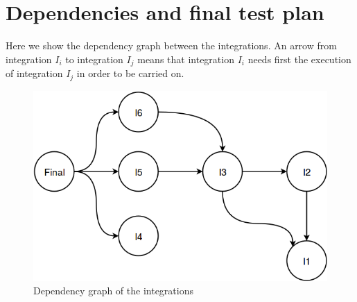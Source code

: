 \section{Dependencies and final test plan}
Here we show the dependency graph between the integrations. An arrow from integration $I_i$ to integration $I_j$ means that integration $I_i$ needs first the execution of integration $I_j$ in order to be carried on.
\begin{figure}[H]
	\centering
	\includegraphics[scale = 0.45]{"../Analysis Documents/Dependencies"}
	\caption{Dependency graph of the integrations}
	\label{fig:dependency}
\end{figure}

